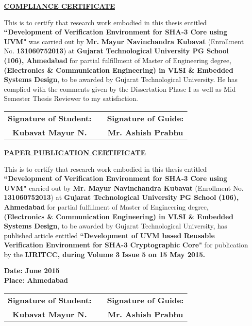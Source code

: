 \thispagestyle{plain}



\begin{center}
	\midsize
	\textbf{\underline {COMPLIANCE CERTIFICATE}}
\end{center}

This is to certify that research work embodied in this thesis entitled \textbf{``Development of Verification Environment for SHA-3 Core using UVM"} was carried out by \textbf{Mr. Mayur Navinchandra Kubavat} (Enrollment No. \textbf{131060752013}) at \textbf{Gujarat Technological University PG School (106), Ahmedabad} for partial fulfillment of Master of Engineering degree, \textbf{(Electronics \& Communication Engineering) in VLSI \& Embedded Systems Design}, to be awarded by Gujarat Technological University. He has complied with the comments given by the Dissertation Phase-I as well as Mid Semester Thesis Reviewer to my satisfaction.

   \begin{tabular}{c m{4cm} c}
   	\textbf{Signature of Student:} & &\textbf{Signature of Guide:} \\
   	\textbf{Kubavat Mayur N.} & &\textbf{Mr. Ashish Prabhu}
   \end{tabular}
   
\thispagestyle{plain}
\vspace{0.5cm}	

\begin{center}
	\midsize
	\textbf{\underline {PAPER PUBLICATION CERTIFICATE}}
\end{center}

This is to certify that research work embodied in this thesis entitled \textbf{``Development of Verification Environment for SHA-3 Core using UVM"} carried out by \textbf{Mr. Mayur Navinchandra Kubavat} (Enrollment No. \textbf{131060752013}) at \textbf{Gujarat Technological University PG School (106), Ahmedabad} for partial fulfillment of Master of Engineering degree, \textbf{(Electronics \& Communication Engineering) in VLSI \& Embedded Systems Design}, to be awarded by Gujarat Technological University, has published article entitled \textbf{``Development of UVM based Reusable Verification Environment for SHA-3 Cryptographic Core"} for publication by the \textbf {IJRITCC, during Volume 3 Issue 5 on 15 May 2015.}
  
    \textbf{Date: June 2015} \\
    \textbf{Place: Ahmedabad}
    
   \begin{tabular}{c m{4cm} c}
   	\textbf{Signature of Student:} & &\textbf{Signature of Guide:} \\
   	\textbf{Kubavat Mayur N.} & &\textbf{Mr. Ashish Prabhu}
   \end{tabular}